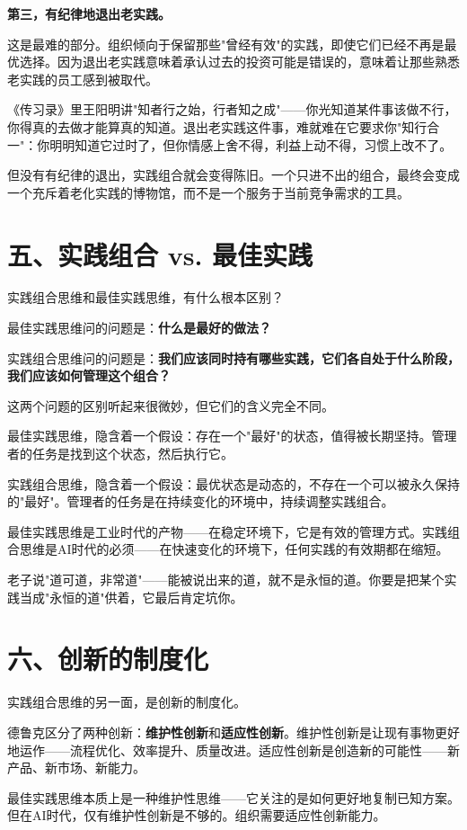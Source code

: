 \textbf{第三，有纪律地退出老实践。}

这是最难的部分。组织倾向于保留那些"曾经有效"的实践，即使它们已经不再是最优选择。因为退出老实践意味着承认过去的投资可能是错误的，意味着让那些熟悉老实践的员工感到被取代。

《传习录》里王阳明讲"知者行之始，行者知之成"——你光知道某件事该做不行，你得真的去做才能算真的知道。退出老实践这件事，难就难在它要求你"知行合一"：你明明知道它过时了，但你情感上舍不得，利益上动不得，习惯上改不了。

但没有有纪律的退出，实践组合就会变得陈旧。一个只进不出的组合，最终会变成一个充斥着老化实践的博物馆，而不是一个服务于当前竞争需求的工具。

\section{五、实践组合 vs. 最佳实践}


实践组合思维和最佳实践思维，有什么根本区别？

最佳实践思维问的问题是：\textbf{什么是最好的做法？}

实践组合思维问的问题是：\textbf{我们应该同时持有哪些实践，它们各自处于什么阶段，我们应该如何管理这个组合？}

这两个问题的区别听起来很微妙，但它们的含义完全不同。

最佳实践思维，隐含着一个假设：存在一个"最好"的状态，值得被长期坚持。管理者的任务是找到这个状态，然后执行它。

实践组合思维，隐含着一个假设：最优状态是动态的，不存在一个可以被永久保持的"最好"。管理者的任务是在持续变化的环境中，持续调整实践组合。

最佳实践思维是工业时代的产物——在稳定环境下，它是有效的管理方式。实践组合思维是AI时代的必须——在快速变化的环境下，任何实践的有效期都在缩短。

老子说"道可道，非常道"——能被说出来的道，就不是永恒的道。你要是把某个实践当成"永恒的道"供着，它最后肯定坑你。

\section{六、创新的制度化}


实践组合思维的另一面，是创新的制度化。

德鲁克区分了两种创新：\textbf{维护性创新}和\textbf{适应性创新}。维护性创新是让现有事物更好地运作——流程优化、效率提升、质量改进。适应性创新是创造新的可能性——新产品、新市场、新能力。

最佳实践思维本质上是一种维护性思维——它关注的是如何更好地复制已知方案。但在AI时代，仅有维护性创新是不够的。组织需要适应性创新能力。

